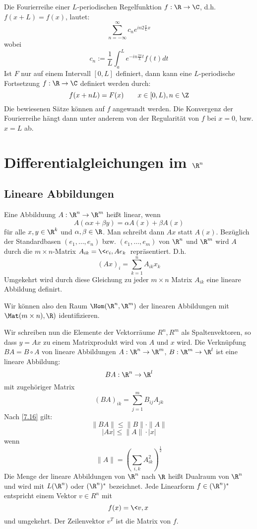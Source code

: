 \documentclass[a4paper,10pt]{scrbook}
\begin{document}
\begin{note}[Schlussbemerkungen]
Die Fourierreihe einer $L$-periodischen Regelfunktion $f:\R\to\C$, d.h. $f(x+L)=f(x)$,
lautet:
\[
\sum_{n=-\infty}^\infty c_ne^{in2\frac\pi Lx}
\]
wobei
\[
c_n:= \frac 1L \int_{a}^Le^{-in\frac{2\pi}Lt}f(t)dt
\]
Ist $F$ nur auf einem Intervall $[0,L]$ definiert, dann kann eine $L$-periodische Fortsetzung
$f:\R\to\C$ definiert werden durch:
\[
f(x+nL)=F(x) \qquad x\in[0,L), n\in\Z
\]
Die bewiesenen Sätze können auf $f$ angewandt werden.
Die Konvergenz der Fourierreihe hängt dann unter anderem von der Regularität von $f$ bei $x=0$, bzw. $x=L$ ab.
\end{note}

\chapter{Differentialgleichungen im $\R^n$}

\section{Lineare Abbildungen}
Eine Abbilduung $A:\R^n\to\R^m$ heißt linear, wenn
\[
A(\alpha x+\beta y)=\alpha A(x)+\beta A(x)
\]
für alle $x,y \in \R^k$ und $\alpha,\beta\in\R$.
Man schreibt dann $Ax$ statt $A(x)$.
Bezüglich der Standardbasen $(e_1,\dotsc,e_n)$ bzw. $(e_1,\dotsc,e_m)$ von $\R^n$ und $\R^m$ wird
$A$ durch die $m\times n$-Matrix $A_{ik}=\<e_{i},Ae_k\>$ repräsentiert.
D.h.
\[
(Ax)_i=\sum_{k=1}^nA_{ik}x_k
\]
Umgekehrt wird durch diese Gleichung zu jeder $m\times n$ Matrix $A_{ik}$ eine lineare Abbildung definirt.

Wir können also den Raum $\Hom(\R^n,\R^m)$ der linearen Abbildungen mit $\Mat(m\times n),\R)$ identifizieren.

Wir schreiben nun die Elemente der Vektorräume $R^n, R^m$ als Spaltenvektoren, so dass $y=Ax$ zu einem Matrixprodukt wird von $A$ und $x$ wird.
Die Verknüpfung $BA = B\circ A$ von lineare Abbildungen $A:\R^n\to\R^m$, $B:\R^m\to\R^l$ ist eine lineare Abbildung:
\[
BA: \R^n\to\R^l
\]
mit zugehöriger Matrix
\[
(BA)_{ik}=\sum_{j=1}^m B_{ij}A_{jk}
\]
Nach \ref{7.16} gilt:
\[
\|BA\|\le \|B\|\cdot \|A\|
\]
\[
|Ax|\le \|A\|\cdot |x|
\]
wenn
\[
\|A\|=\left(\sum_{i,k}A_{ik}^2\right)^{\frac 12}
\]
Die Menge der lineare Abbildungen von $\R^n$ nach $\R$ heißt Dualraum von $\R^n$ und wird mit $L(\R^n)$ oder $(\R^n)^*$ bezeichnet.
Jede Linearform $f\in(\R^n)^*$ entspricht einem Vektor $v\in R^n$ mit
\[
f(x)=\<v,x\>
\]
und umgekehrt.
Der Zeilenvektor $v^T$ ist die Matrix von $f$.
\end{document}
